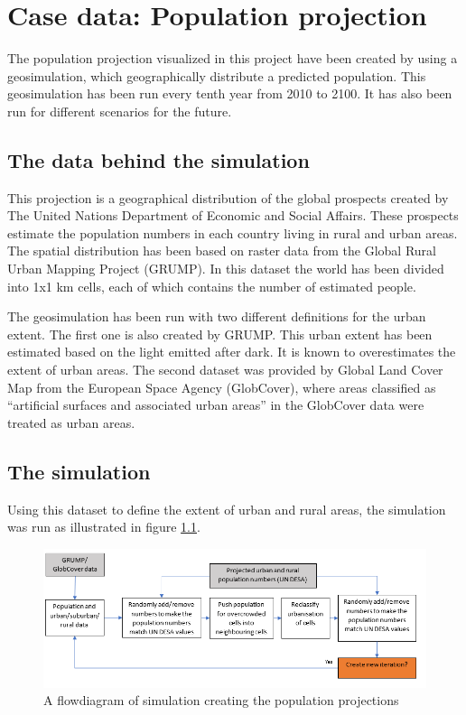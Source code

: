 \chapter{Case data: Population projection}\label{CCaseData}
The population projection visualized in this project have been created by \citet{Kessler} using a geosimulation, which geographically distribute a predicted population. This geosimulation has been run every tenth year from 2010 to 2100. It has also been run for different scenarios for the future.

\section{The data behind the simulation}\label{TheDataBehind}
This projection is a geographical distribution of the global prospects created by The United Nations Department of Economic and Social Affairs. These prospects estimate the population numbers in each country living in rural and urban areas. The spatial distribution has been based on raster data from the Global Rural Urban Mapping Project (GRUMP). In this dataset the world has been divided into 1x1 km cells, each of which contains the number of estimated people. \citep{Kessler}

The geosimulation has been run with two different definitions for the urban extent. The first one is also created by GRUMP. This urban extent has been estimated based on the light emitted after dark. It is known to overestimates the extent of urban areas. \citep{Kessler}
The second dataset was provided by Global Land Cover Map from the European Space Agency (GlobCover), where areas classified as “artificial surfaces and associated urban areas” in the GlobCover data were treated as urban areas. 

\section{The simulation}
Using this dataset to define the extent of urban and rural areas, the simulation was run as illustrated in figure \ref{CreatingData}.

\begin{figure} [H]
	\centering
	\includegraphics[width=1\textwidth]{Pictures/CreatingData}
	\caption{A flowdiagram of simulation creating the population projections}
	\label{CreatingData}
\end{figure}

